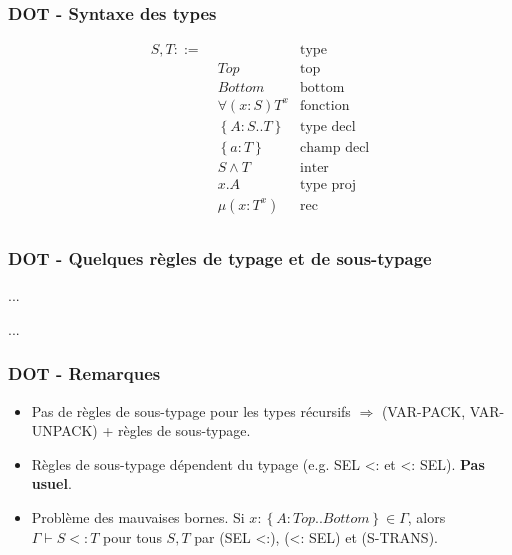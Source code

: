 \documentclass{beamer}
\begin{document}
\begin{frame}
  \frametitle{DOT - Syntaxe des types}
  \begin{align*}
    S, T ::= & \, & \text{type} \\
             & \; Top & \text{top} \\
             & \; Bottom & \text{bottom} \\
             & \; \forall(x : S) T^{x} & \text{fonction} \\
             & \; \left\{ A : S .. T \right\} & \text{type decl} \\
             & \; \left\{ a : T \right\} & \text{champ decl} \\
             & \; S \wedge T & \text{inter} \\
             & \; x.A & \text{type proj} \\
             & \; \mu(x : T^{x}) & \text{rec} \\
  \end{align*}
\end{frame} 


\begin{frame}
  \frametitle{DOT - Quelques règles de typage et de sous-typage}
  \begin{center}
    \Huge{...}
  \end{center}
  \begin{center}
    \Huge{...}
  \end{center}
\end{frame}

%

\begin{frame}
  \frametitle{DOT - Remarques}
  \begin{itemize}
  \item Pas de règles de sous-typage pour les types récursifs $\Rightarrow$
    (VAR-PACK, VAR-UNPACK) + règles de sous-typage.
  \item Règles de sous-typage dépendent du typage (e.g. SEL <: et <: SEL). \textbf{Pas usuel}.
  \item Problème des mauvaises bornes. Si $x : \left\{ A : Top .. Bottom
    \right\} \in \Gamma$, alors $\Gamma \vdash S <: T$ pour tous $S, T$ par (SEL <:),
    (<: SEL) et (S-TRANS).
  \end{itemize}
\end{frame}
\end{document}
